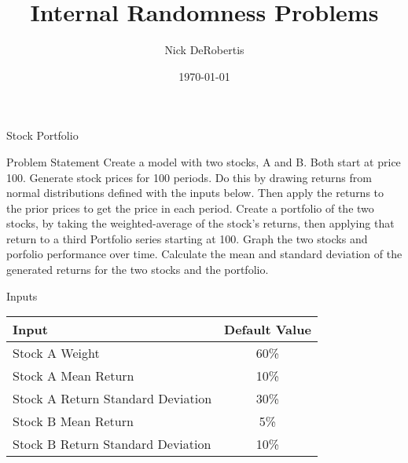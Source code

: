 \documentclass[]{article}
\begin{document}
\title{Internal Randomness Problems}
\author{Nick DeRobertis}
\date{\today}
\maketitle
\begin{section}{Stock Portfolio}
\begin{subsection}{Problem Statement}
Create a model with two stocks, A and B. Both start at price 100. Generate stock prices for 100 periods. Do this by drawing returns from normal distributions defined with the inputs below. Then apply the returns to the prior prices to get the price in each period. Create a portfolio of the two stocks, by taking the weighted-average of the stock's returns, then applying that return to a third Portfolio series starting at 100. Graph the two stocks and porfolio performance over time. Calculate the mean and standard deviation of the generated returns for the two stocks and the portfolio.
\end{subsection}
\begin{subsection}{Inputs}
\begin{center}
\begin{tabular}{l|c}
\toprule
Input & Default Value\\

\midrule
Stock A Weight & 60\%\\
Stock A Mean Return & 10\%\\
Stock A Return Standard Deviation & 30\%\\
Stock B Mean Return & 5\%\\
Stock B Return Standard Deviation & 10\%\\

\bottomrule
\end{tabular}
\end{center}
\end{subsection}
\end{section}
\end{document}
